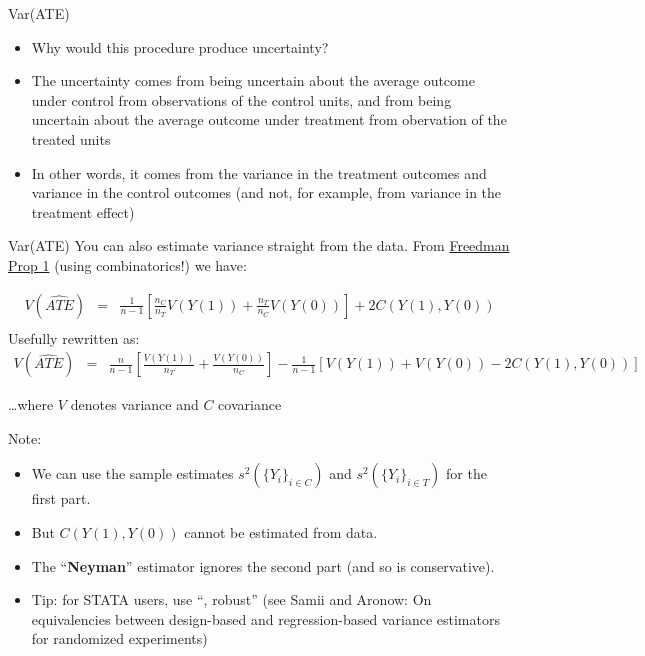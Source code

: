 \documentclass[
  11pt,
  ignorenonframetext,
]{beamer}
\providecommand{\tightlist}{%
  \setlength{\itemsep}{0pt}\setlength{\parskip}{0pt}}\usepackage{longtable,booktabs,array}
\begin{document}
\begin{frame}{Var(ATE)}
\protect\hypertarget{varate-1}{}
\begin{itemize}
\tightlist
\item
  Why would this procedure produce uncertainty?
\item
  The uncertainty comes from being uncertain about the average outcome
  under control from observations of the control units, and from being
  uncertain about the average outcome under treatment from obervation of
  the treated units
\item
  In other words, it comes from the variance in the treatment outcomes
  and variance in the control outcomes (and not, for example, from
  variance in the treatment effect)
\end{itemize}
\end{frame}

\begin{frame}{Var(ATE)}
\protect\hypertarget{varate-2}{}
\scriptsize You can also estimate variance straight from the data. From
\href{http://www.stat.berkeley.edu/~census/neyregcm.pdf}{Freedman Prop 1}
(using combinatorics!) we have:

\begin{eqnarray*} 
V(\widehat{ATE})  &=  &\frac{1}{n-1}\left[\frac{n_C}{n_T}V(Y(1)) +  \frac{n_T}{n_C}V(Y(0))\right] + 2C\left(Y(1),Y(0)\right)  \nonumber \\
\end{eqnarray*} Usefully rewritten as: \begin{eqnarray*} 
V(\widehat{ATE})  &=  &\frac{n}{n-1}\left[\frac{V(Y(1))}{n_T} +  \frac{V(Y(0))}{n_C}\right] - \frac{1}{n-1}\left[V(Y(1)) + V(Y(0)) - 2C\left(Y(1),Y(0)\right)\right]  \nonumber 
\end{eqnarray*}

\dots where \(V\) denotes variance and \(C\) covariance

Note:

\begin{itemize} \scriptsize
\item We can use the sample estimates $s^2(\{Y_i\}_{i \in C})$ and $s^2(\{Y_i\}_{i \in T})$ for the first part.
\item But $C(Y(1),Y(0))$ cannot be estimated from data.
\item The ``\textbf{Neyman}'' estimator ignores the second part (and so is conservative).
\item Tip: for STATA users, use ``, robust'' (see Samii and Aronow: On equivalencies between design-based and regression-based variance estimators for randomized experiments)
\end{itemize}
\end{frame}
\end{document}
